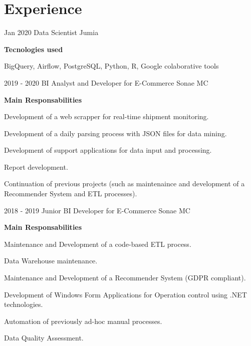 \section{Experience}
\begin{entrylist}
  \entry
  {Jan 2020}
  {Data Scientist}
  {Jumia}
  {\textbf{Tecnologies used}
  
  BigQuery, Airflow, PostgreSQL, Python, R, Google colaborative tools
  
  }
  
  \entry
  {2019 - 2020}
  {BI Analyst and Developer for E-Commerce}
  {Sonae MC}
  {\textbf{Main Responsabilities}
  
Development of a web scrapper for real-time shipment monitoring.

Development of a daily parsing process with JSON files for data mining.

Development of support applications for data input and processing.

Report development.

Continuation of previous projects (such as maintenaince and development of a Recommender System and ETL processes).
  }

  \entry
  {2018 - 2019}
  {Junior BI Developer for E-Commerce}
  {Sonae MC}
{  \textbf{Main Responsabilities}
  
  Maintenance and Development of a code-based ETL process.
  
  Data Warehouse maintenance.
  
  Maintenance and Development of a Recommender System (GDPR compliant).
  
  Development of Windows Form Applications for Operation control using .NET technologies.
  
  Automation of previously ad-hoc manual processes.
  
  Data Quality Assessment.
  }
\end{entrylist}